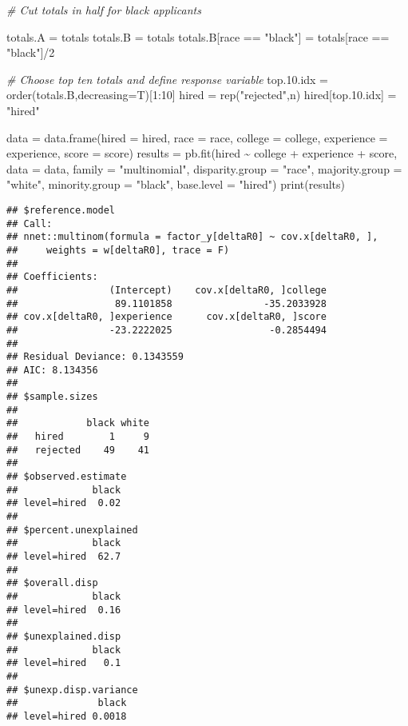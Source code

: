\documentclass[
]{article}
\newenvironment{Shaded}{\begin{snugshade}}{\end{snugshade}}
\newcommand{\AttributeTok}[1]{\textcolor[rgb]{0.77,0.63,0.00}{#1}}
\newcommand{\CommentTok}[1]{\textcolor[rgb]{0.56,0.35,0.01}{\textit{#1}}}
\newcommand{\DecValTok}[1]{\textcolor[rgb]{0.00,0.00,0.81}{#1}}
\newcommand{\FloatTok}[1]{\textcolor[rgb]{0.00,0.00,0.81}{#1}}
\newcommand{\FunctionTok}[1]{\textcolor[rgb]{0.00,0.00,0.00}{#1}}
\newcommand{\NormalTok}[1]{#1}
\newcommand{\OtherTok}[1]{\textcolor[rgb]{0.56,0.35,0.01}{#1}}
\newcommand{\SpecialCharTok}[1]{\textcolor[rgb]{0.00,0.00,0.00}{#1}}
\newcommand{\StringTok}[1]{\textcolor[rgb]{0.31,0.60,0.02}{#1}}
\begin{document}
\begin{Shaded}
\begin{Highlighting}[]
 \CommentTok{\# Cut totals in half for black applicants}
 
\NormalTok{ totals.A }\OtherTok{=}\NormalTok{ totals}
\NormalTok{ totals.B }\OtherTok{=}\NormalTok{ totals}
\NormalTok{ totals.B[race }\SpecialCharTok{==} \StringTok{"black"}\NormalTok{] }\OtherTok{=}\NormalTok{ totals[race }\SpecialCharTok{==} \StringTok{"black"}\NormalTok{]}\SpecialCharTok{/}\DecValTok{2}
 
 \CommentTok{\# Choose top ten totals and define response variable}
\NormalTok{ top.}\FloatTok{10.}\NormalTok{idx }\OtherTok{=} \FunctionTok{order}\NormalTok{(totals.B,}\AttributeTok{decreasing=}\NormalTok{T)[}\DecValTok{1}\SpecialCharTok{:}\DecValTok{10}\NormalTok{]}
\NormalTok{ hired }\OtherTok{=} \FunctionTok{rep}\NormalTok{(}\StringTok{"rejected"}\NormalTok{,n)}
\NormalTok{ hired[top.}\FloatTok{10.}\NormalTok{idx] }\OtherTok{=} \StringTok{"hired"}
 
\NormalTok{ data }\OtherTok{=} \FunctionTok{data.frame}\NormalTok{(}\AttributeTok{hired =}\NormalTok{ hired,}
                   \AttributeTok{race =}\NormalTok{ race,}
                   \AttributeTok{college =}\NormalTok{ college,}
                   \AttributeTok{experience =}\NormalTok{ experience,}
                   \AttributeTok{score =}\NormalTok{ score)}
\NormalTok{ results }\OtherTok{=} \FunctionTok{pb.fit}\NormalTok{(hired }\SpecialCharTok{\textasciitilde{}}\NormalTok{ college }\SpecialCharTok{+}\NormalTok{ experience }\SpecialCharTok{+}\NormalTok{ score,}
                  \AttributeTok{data =}\NormalTok{ data,}
                  \AttributeTok{family =} \StringTok{"multinomial"}\NormalTok{,}
                  \AttributeTok{disparity.group =} \StringTok{"race"}\NormalTok{,}
                  \AttributeTok{majority.group =} \StringTok{"white"}\NormalTok{,}
                  \AttributeTok{minority.group =} \StringTok{"black"}\NormalTok{,}
                  \AttributeTok{base.level =} \StringTok{"hired"}\NormalTok{)}
 \FunctionTok{print}\NormalTok{(results)}
\end{Highlighting}
\end{Shaded}

\begin{verbatim}
## $reference.model
## Call:
## nnet::multinom(formula = factor_y[deltaR0] ~ cov.x[deltaR0, ], 
##     weights = w[deltaR0], trace = F)
## 
## Coefficients:
##                (Intercept)    cov.x[deltaR0, ]college 
##                 89.1101858                -35.2033928 
## cov.x[deltaR0, ]experience      cov.x[deltaR0, ]score 
##                -23.2222025                 -0.2854494 
## 
## Residual Deviance: 0.1343559 
## AIC: 8.134356 
## 
## $sample.sizes
##           
##            black white
##   hired        1     9
##   rejected    49    41
## 
## $observed.estimate
##             black
## level=hired  0.02
## 
## $percent.unexplained
##             black
## level=hired  62.7
## 
## $overall.disp
##             black
## level=hired  0.16
## 
## $unexplained.disp
##             black
## level=hired   0.1
## 
## $unexp.disp.variance
##              black
## level=hired 0.0018
\end{verbatim}
\end{document}
